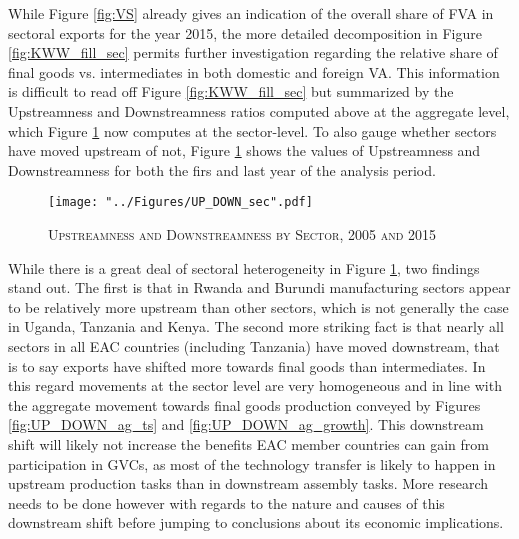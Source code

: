 \documentclass[a4paper]{article}
\begin{document}
While Figure \ref{fig:VS} already gives an indication of the overall share of FVA in sectoral exports for the year 2015, the more detailed decomposition in Figure \ref{fig:KWW_fill_sec} permits further investigation regarding the relative share of final goods vs. intermediates in both domestic and foreign VA.  This information is difficult to read off Figure \ref{fig:KWW_fill_sec} but summarized by the Upstreamness and Downstreamness ratios computed above at the aggregate level, which Figure \ref{fig:UP_DOWN_sec} now computes at the sector-level. To also gauge whether sectors have moved upstream of not, Figure \ref{fig:UP_DOWN_sec} shows the values of Upstreamness and Downstreamness for both the firs and last year of the analysis period. 

\begin{figure}[h!]
\centering
\caption{\label{fig:UP_DOWN_sec}\textsc{Upstreamness and Downstreamness by Sector, 2005 and 2015}}
\texttt{[image: "../Figures/UP\_DOWN\_sec".pdf]} %
\end{figure}
\FloatBarrier

While there is a great deal of sectoral heterogeneity in Figure \ref{fig:UP_DOWN_sec}, two findings stand out. The first is that in Rwanda and Burundi manufacturing sectors appear to be relatively more upstream than other sectors, which is not generally the case in Uganda, Tanzania and Kenya. The second more striking fact is that nearly all sectors in all EAC countries (including Tanzania) have moved downstream, that is to say exports have shifted more towards final goods than intermediates. In this regard movements at the sector level are very homogeneous and in line with the aggregate movement towards final goods production conveyed by Figures \ref{fig:UP_DOWN_ag_ts} and \ref{fig:UP_DOWN_ag_growth}. This downstream shift will likely not increase the benefits EAC member countries can gain from participation in GVCs, as most of the technology transfer is likely to happen in upstream production tasks than in downstream assembly tasks. More research needs to be done however with regards to the nature and causes of this downstream shift before jumping to conclusions about its economic implications. 
\end{document}
